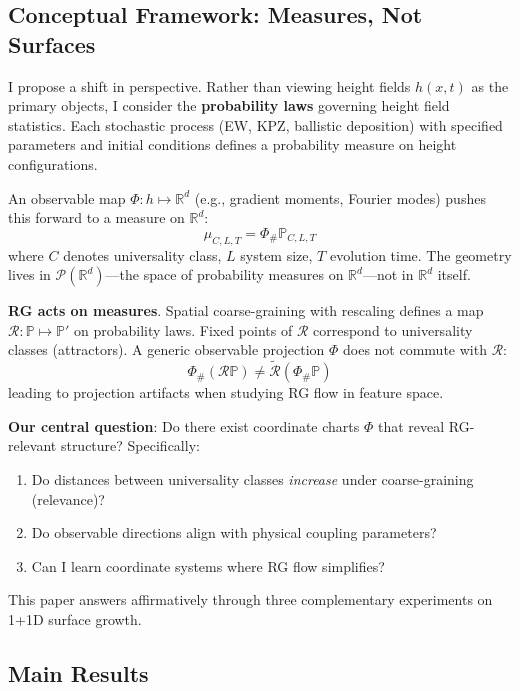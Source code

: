 \documentclass[aps,pre,reprint,amsmath,amssymb,superscriptaddress]{revtex4-2}
\newcommand{\bbP}{\mathbb{P}}
\newcommand{\bbR}{\mathbb{R}}
\begin{document}
\subsection{Conceptual Framework: Measures, Not Surfaces}

I propose a shift in perspective. Rather than viewing height fields $h(x,t)$ as the primary objects, I consider the \textbf{probability laws} governing height field statistics. Each stochastic process (EW, KPZ, ballistic deposition) with specified parameters and initial conditions defines a probability measure on height configurations.

An observable map $\Phi: h \mapsto \bbR^d$ (e.g., gradient moments, Fourier modes) pushes this forward to a measure on $\bbR^d$:
\begin{equation}
\mu_{C,L,T} = \Phi_\# \bbP_{C,L,T}
\label{eq:pushforward}
\end{equation}
where $C$ denotes universality class, $L$ system size, $T$ evolution time. The geometry lives in $\mathcal{P}(\bbR^d)$---the space of probability measures on $\bbR^d$---not in $\bbR^d$ itself.

\textbf{RG acts on measures}. Spatial coarse-graining with rescaling defines a map $\mathcal{R}: \bbP \mapsto \bbP'$ on probability laws. Fixed points of $\mathcal{R}$ correspond to universality classes (attractors). A generic observable projection $\Phi$ does not commute with $\mathcal{R}$:
\begin{equation}
\Phi_\# (\mathcal{R} \bbP) \neq \widetilde{\mathcal{R}}(\Phi_\# \bbP)
\end{equation}
leading to projection artifacts when studying RG flow in feature space.

\textbf{Our central question}: Do there exist coordinate charts $\Phi$ that reveal RG-relevant structure? Specifically:
\begin{enumerate}
\item Do distances between universality classes \textit{increase} under coarse-graining (relevance)?
\item Do observable directions align with physical coupling parameters?
\item Can I learn coordinate systems where RG flow simplifies?
\end{enumerate}

This paper answers affirmatively through three complementary experiments on 1+1D surface growth.

\subsection{Main Results}
\end{document}
